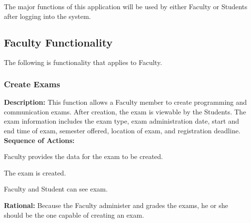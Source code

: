 
\label{sec:product_functions}


The major functions of this application will be used by either Faculty or Students
after logging into the system.

\subsection{Faculty Functionality}
The following is functionality that applies to Faculty.

   \subsubsection{\large Create Exams} 
   \begin{boxed} %
      \textbf{Description:}
      {\small This function allows a Faculty member to create programming and
         communication exams. After creation, the exam is viewable by the
         Students. The exam information includes the exam type, exam
         administration date, start and end time of exam, semester offered,
         location of exam, and registration deadline.} \\

      \textbf{Sequence of Actions:}
      \begin{enumerate}
            {\small
         \item Faculty provides the data for the exam to be created.
         \item The exam is created.
         \item Faculty and Student can see exam.}
      \end{enumerate}

      \textbf{Rational:}
      {\small Because the Faculty administer and grades the exams, he or she should
      be the one capable of creating an exam.}
   \end{boxed} %

